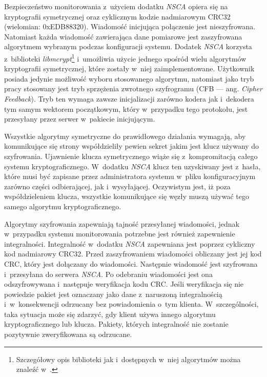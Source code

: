 Bezpieczeństwo monitorowania z~użyciem dodatku {\em NSCA} opiera się na
kryptografii symetrycznej oraz cyklicznym kodzie nadmiarowym CRC32
(wielomian: 0xEDB88320). Wiadomość inicjująca połączenie jest
nieszyfrowana. Natomiast każda wiadomość zawierająca dane pomiarowe
jest zaszyfrowana algorytmem wybranym podczas konfiguracji
systemu. Dodatek {\em NSCA} korzysta z~biblioteki
{\em libmcrypt}\footnote{Szczegółowy opis biblioteki jak i~dostępnych w~niej
  algorytmów można znaleźć w~\cite{www:libmcrypt}.} i~umożliwia użycie
jednego spośród wielu algorytmów kryptografii symetrycznej, które
zostały w~niej zaimplementowane. Użytkownik posiada jedynie możliwość
wyboru stosowanego algorytmu, natomiast jako tryb pracy stosowany jest
tryb sprzężenia zwrotnego szyfrogramu (CFB --- ang. {\em Cipher
  Feedback}). Tryb ten wymaga zawsze inicjalizacji zarówno kodera jak
i~dekodera tym samym wektorem początkowym, który w~przypadku tego
protokołu, jest przesyłany przez serwer w~pakiecie inicjującym.

Wszystkie algorytmy symetryczne do prawidłowego działania wymagają,
aby komunikujące się strony współdzieliły pewien sekret jakim jest
klucz używany do szyfrowania. Ujawnienie klucza symetrycznego wiąże
się z~kompromitacją całego systemu kryptograficznego. W~dodatku {\em NSCA}
klucz ten uzyskiwany jest z~hasła, które musi być zapisane przez
administratora systemu w~pliku konfiguracyjnym zarówno części
odbierającej, jak i~wysyłającej. Oczywistym jest, iż poza
współdzieleniem klucza, wszystkie komunikujące się węzły muszą używać
tego samego algorytmu kryptograficznego.

Algorytmy szyfrowania zapewniają tajność przesyłanej wiadomości,
jednak w~przypadku systemu monitorowania potrzebne jest również
zapewnienie integralności. Integralność w~dodatku {\em NSCA} zapewniana jest
poprzez cykliczny kod nadmiarowy CRC32. Przed zaszyfrowaniem
wiadomości obliczany jest jej kod CRC, który jest dołączany do
wiadomości. Następnie wiadomość jest szyfrowana i~przesyłana do
serwera {\em NSCA}. Po odebraniu wiadomości jest ona odszyfrowywana
i~następuje weryfikacja kodu CRC. Jeśli weryfikacja się nie powiedzie
pakiet jest oznaczany jako dane z~naruszoną integralnością
i~w~konsekwencji odrzucany bez powiadomienia o~tym
klienta. W~szczególności, taka sytuacja może się zdarzyć, gdy klient
używa innego algorytmu kryptograficznego lub klucza. Pakiety, których
integralność nie zostanie pozytywnie zweryfikowana są odrzucane.

